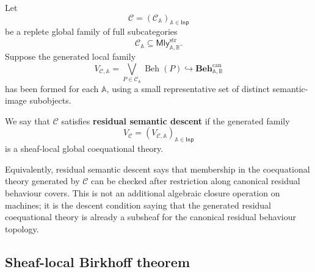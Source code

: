 \begin{definition}
\label{def:residual-semantic-descent}
    Let
    \[
        \mathcal C=(\mathcal C_{\mathbb A})_{\mathbb A\in\mathsf{Inp}}
    \]
    be a replete global family of full subcategories
    \[
        \mathcal C_{\mathbb A}
        \subseteq
        \mathsf{Mly}^{\mathrm{str}}_{\mathbb A,\mathbb B}.
    \]
    Suppose the generated local family
    \[
        V_{\mathcal C,\mathbb A}
        =
        \bigvee_{P\in\mathcal C_{\mathbb A}}
        \operatorname{Beh}(P)
        \hookrightarrow
        \mathbf{Beh}^{\mathrm{can}}_{\mathbb A,\mathbb B}
    \]
    has been formed for each \(\mathbb A\), using a small representative set of
    distinct semantic-image subobjects.

    We say that \(\mathcal C\) satisfies \textbf{residual semantic descent} if
    the generated family
    \[
        V_{\mathcal C}
        =
        (V_{\mathcal C,\mathbb A})_{\mathbb A\in\mathsf{Inp}}
    \]
    is a sheaf-local global coequational theory.
\end{definition}

Equivalently, residual semantic descent says that membership in the
coequational theory generated by \(\mathcal C\) can be checked after
restriction along canonical residual behaviour covers. This is not an
additional algebraic closure operation on machines; it is the descent condition
saying that the generated residual coequational theory is already a subsheaf
for the canonical residual behaviour topology.

\subsection{Sheaf-local Birkhoff theorem}
\label{subsec:sheaf-local-birkhoff-theorem}

